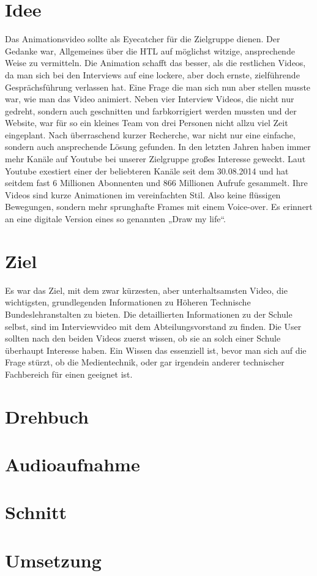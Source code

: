 \section{Idee}
\renewcommand{\kapitelautor}{Autor: Niklas Kienreich}
Das Animationsvideo sollte als Eyecatcher für die Zielgruppe dienen. Der Gedanke war, Allgemeines über die HTL auf möglichst witzige, ansprechende Weise zu vermitteln. Die Animation schafft das besser, als die restlichen Videos, da man sich bei den Interviews auf eine lockere, aber doch ernste, zielführende Gesprächsführung verlassen hat. Eine Frage die man sich nun aber stellen musste war, wie man das Video animiert. Neben vier Interview Videos, die nicht nur gedreht, sondern auch geschnitten und farbkorrigiert werden mussten und der Website, war für so ein kleines Team von drei Personen nicht allzu viel Zeit eingeplant. Nach überraschend kurzer Recherche, war nicht nur eine einfache, sondern auch ansprechende Lösung gefunden. In den letzten Jahren haben immer mehr Kanäle auf Youtube bei unserer Zielgruppe großes Interesse geweckt. Laut Youtube exestiert einer der beliebteren Kanäle seit dem 30.08.2014 und hat seitdem fast 6 Millionen Abonnenten und 866 Millionen Aufrufe gesammelt. Ihre Videos sind kurze Animationen im vereinfachten Stil. Also keine flüssigen Bewegungen, sondern mehr sprunghafte Frames mit einem Voice-over. Es erinnert an eine digitale Version eines so genannten „Draw my life“.
\section{Ziel}
\renewcommand{\kapitelautor}{Autor: Niklas Kienreich}
Es war das Ziel, mit dem zwar kürzesten, aber unterhaltsamsten Video, die wichtigsten, grundlegenden Informationen zu Höheren Technische Bundeslehranstalten zu bieten. Die detaillierten Informationen zu der Schule selbst, sind im Interviewvideo mit dem Abteilungsvorstand zu finden. Die User sollten nach den beiden Videos zuerst wissen, ob sie an solch einer Schule überhaupt Interesse haben. Ein Wissen das essenziell ist, bevor man sich auf die Frage stürzt, ob die Medientechnik, oder gar irgendein anderer technischer Fachbereich für einen geeignet ist.
\section{Drehbuch}
\renewcommand{\kapitelautor}{Autor: Niklas Kienreich}
\section{Audioaufnahme}
\renewcommand{\kapitelautor}{Autor: Niklas Kienreich}
\section{Schnitt}
\renewcommand{\kapitelautor}{Autor: Niklas Kienreich}
\section{Umsetzung}
\renewcommand{\kapitelautor}{Autor: Niklas Kienreich}